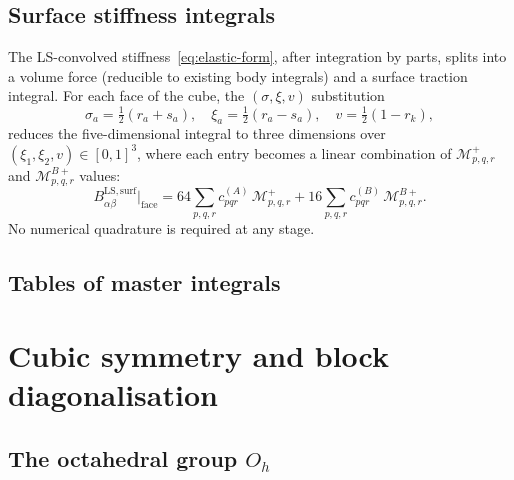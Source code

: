 \documentclass[11pt,a4paper]{article}
\newcommand{\Oh}{O_h}
\theoremstyle{plain}
\theoremstyle{definition}
\theoremstyle{remark}
\begin{document}
\subsection{Surface stiffness integrals}

The LS-convolved stiffness~\eqref{eq:elastic-form}, after integration
by parts, splits into a volume force (reducible to existing body
integrals) and a surface traction integral.  For each face of the cube,
the $(\sigma,\xi,v)$ substitution
\begin{equation}
  \sigma_a = \tfrac{1}{2}(r_a + s_a),\quad
  \xi_a = \tfrac{1}{2}(r_a - s_a),\quad
  v = \tfrac{1}{2}(1 - r_k),
  \label{eq:sigma-xi-v}
\end{equation}
reduces the five-dimensional integral to three dimensions over
$(\xi_1,\xi_2,v) \in [0,1]^3$, where each entry becomes a linear
combination of $\mathcal{M}^+_{p,q,r}$ and $\mathcal{M}^{B+}_{p,q,r}$
values:
\begin{equation}
  B^{\mathrm{LS,surf}}_{\alpha\beta}\big|_{\text{face}}
  = 64\!\sum_{p,q,r}\!c^{(A)}_{pqr}\,\mathcal{M}^+_{p,q,r}
  + 16\!\sum_{p,q,r}\!c^{(B)}_{pqr}\,\mathcal{M}^{B+}_{p,q,r}.
  \label{eq:surf-master}
\end{equation}
No numerical quadrature is required at any stage.

\subsection{Tables of master integrals}
\label{sec:master-tables}




\section{Cubic symmetry and block diagonalisation}
\label{sec:cubic-symmetry}

\subsection{The octahedral group $\Oh$}
\end{document}
